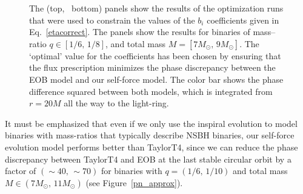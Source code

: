 \begin{figure}
{}
\caption{The (top, \, bottom) panels show the results of the optimization runs that were used to constrain the values of the \(b_i\) coefficients given in Eq.~\eqref{etacorrect}. The panels show the results for binaries of mass--ratio \(q\in [1/6,\, 1/8]\), and total mass \(M= [7M_{\odot},\,   9M_{\odot}]\). The `optimal' value for the coefficients has been chosen by ensuring that the flux prescription minimizes the phase discrepancy between the EOB model and our self-force model. The color bar shows the phase difference squared between both models, which is integrated from \(r=20M\) all the way to the light-ring.} 
\label{bimaps}
\end{figure}

It must be emphasized that even if we only use the inspiral evolution to model binaries with mass-ratios that typically describe NSBH binaries, our self-force evolution model performs better than TaylorT4, since we can reduce the phase discrepancy between TaylorT4 and EOB at the last stable circular orbit by a factor of \((\sim40, \, \sim70)\)  for binaries with \(q=(1/6,\,1/10)\)  and total mass \(M\in (7M_{\odot} ,\, 11M_{\odot} )\) (see Figure~\ref{pn_approx}).


